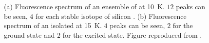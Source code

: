     \begin{figure}[thbp]
  		\begin{subfigure}[t]{ 0.49\linewidth}
  			\centering
  			\caption{}
  		\end{subfigure}
  		\hfill
  		\begin{subfigure}[t]{ 0.49\linewidth}
  			\centering
  			\caption{}
  		\end{subfigure}
  		\caption[Fluorescence spectra of \sivs at low temperature]{(a) Fluorescence spectrum of an ensemble of \sivs at \SI{10}{\kelvin}. $12$ peaks can be seen, $4$ for each stable isotope of silicon \cite{Clark1995}. (b) Fluorescence spectrum of an isolated \siv at \SI{15}{\kelvin}. $4$ peaks can be seen, $2$ for the ground state and $2$ for the excited state. Figure reproduced from \cite{Riedrich-moller2014}.}
  		\label{fig::cryogenic_spectra}
  	\end{figure}
